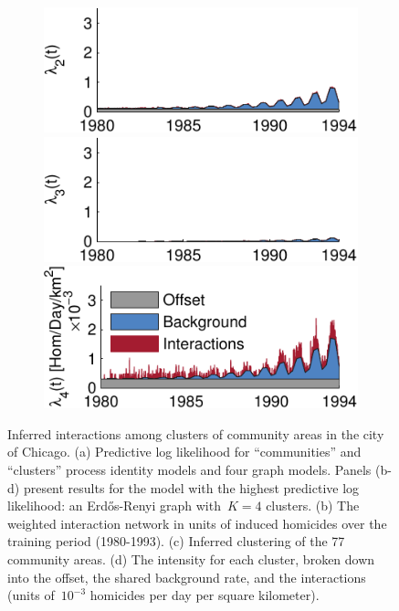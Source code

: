 \begin{figure}[!t]
\begin{center}
\begin{subfigure}[B]{.28\textwidth}
\includegraphics[width=\linewidth]{figures/ch2/icpsr_rate2} \\ 
\includegraphics[width=\linewidth]{figures/ch2/icpsr_rate3} \\
\includegraphics[width=\linewidth]{figures/ch2/icpsr_rate4} 
\caption{}
\label{fig:chicago_rates}
\end{subfigure}
\end{center}
\vspace{-1em}
\caption{Inferred interactions among clusters of community areas in the city of Chicago. (a) Predictive log likelihood for ``communities'' and ``clusters''  process identity models and four graph models. 
Panels (b-d) present results for the model with the highest predictive log likelihood: an Erd\H{o}s-Renyi graph with~${K=4}$ clusters.  (b) The weighted interaction network in units of induced homicides over the training period (1980-1993). (c) Inferred clustering of the 77 community areas. (d) The intensity for each cluster, broken down into the offset, the shared background rate, and the interactions (units of~${10^{-3}}$ homicides per day per square kilometer).}
\label{fig:chicago}
\vspace{-1em}
\end{figure}
